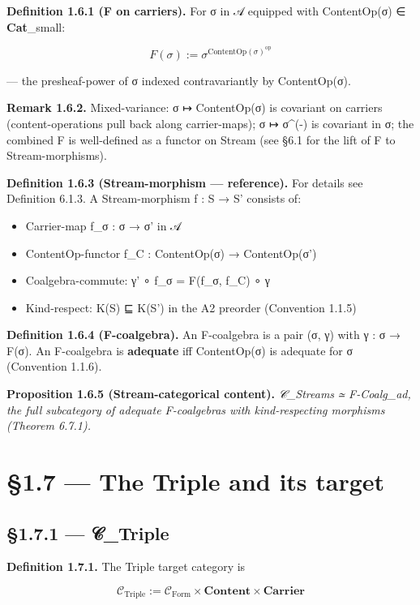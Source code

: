 \documentclass[11pt, openany]{book}
\newcommand{\sectionbreak}{\clearpage}
\begin{document}
\textbf{Definition 1.6.1 (F on carriers).} For σ in 𝒜 equipped with ContentOp(σ) ∈ \textbf{Cat}\_\allowbreak{}small:

\[
F(σ) := σ^{\mathrm{ContentOp}(σ)^\mathrm{op}}
\]

--- the presheaf-power of σ indexed contravariantly by ContentOp(σ).

\textbf{Remark 1.6.2.} Mixed-variance: σ ↦ ContentOp(σ) is covariant on carriers (content-operations pull back along carrier-maps); σ ↦ σ\textasciicircum{}(-) is covariant in σ; the combined F is well-defined as a functor on Stream (see §6.1 for the lift of F to Stream-morphisms).

\textbf{Definition 1.6.3 (Stream-morphism --- reference).} For details see Definition 6.1.3. A Stream-morphism f : S → S' consists of:
\begin{itemize}
\item Carrier-map f\_\allowbreak{}σ : σ → σ' in 𝒜
\item ContentOp-functor f\_\allowbreak{}C : ContentOp(σ) → ContentOp(σ')
\item Coalgebra-commute: γ' ∘ f\_\allowbreak{}σ = F(f\_\allowbreak{}σ, f\_\allowbreak{}C) ∘ γ
\item Kind-respect: K(S) ⊑ K(S') in the A2 preorder (Convention 1.1.5)
\end{itemize}

\textbf{Definition 1.6.4 (F-coalgebra).} An F-coalgebra is a pair (σ, γ) with γ : σ → F(σ). An F-coalgebra is \textbf{adequate} iff ContentOp(σ) is adequate for σ (Convention 1.1.6).

\textbf{Proposition 1.6.5 (Stream-categorical content).} \textit{𝒞\_\allowbreak{}Streams ≃ F-Coalg\_\allowbreak{}ad, the full subcategory of adequate F-coalgebras with kind-respecting morphisms (Theorem 6.7.1).}

\sectionbreak

\section{§1.7 --- The Triple and its target}

\subsection{§1.7.1 --- 𝒞\_\allowbreak{}Triple}

\textbf{Definition 1.7.1.} The Triple target category is

\[
\mathcal{C}_\mathrm{Triple} := \mathcal{C}_\mathrm{Form} \times \mathbf{Content} \times \mathbf{Carrier}
\]
\end{document}
